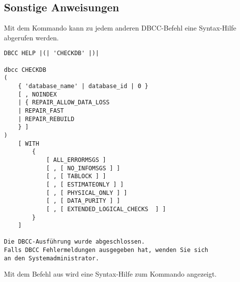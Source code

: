       \subsection{Sonstige Anweisungen}
        Mit dem Kommando  kann zu jedem anderen
        DBCC-Befehl eine Syntax-Hilfe abgerufen werden.
        \begin{lstlisting}[language=ms_sql, caption={DBCC Help - Syntaxhilfe
        aufrufen}, label=admin03_38] 
DBCC HELP |(| 'CHECKDB' |)|

dbcc CHECKDB 
(
    { 'database_name' | database_id | 0 }
    [ , NOINDEX
    | { REPAIR_ALLOW_DATA_LOSS
    | REPAIR_FAST
    | REPAIR_REBUILD
    } ]
)
    [ WITH
        {
            [ ALL_ERRORMSGS ]
            [ , [ NO_INFOMSGS ] ]
            [ , [ TABLOCK ] ]
            [ , [ ESTIMATEONLY ] ]
            [ , [ PHYSICAL_ONLY ] ]
            [ , [ DATA_PURITY ] ]
            [ , [ EXTENDED_LOGICAL_CHECKS  ] ]
        }
    ]

Die DBCC-Ausführung wurde abgeschlossen. 
Falls DBCC Fehlermeldungen ausgegeben hat, wenden Sie sich 
an den Systemadministrator.
          \end{lstlisting}          
          Mit dem Befehl aus  wird eine Syntax-Hilfe zum
          Kommando  angezeigt.
          \begin{literaturinternet}
            \item \cite{ms176040}
          \end{literaturinternet}
